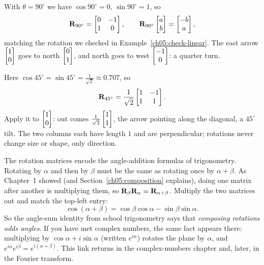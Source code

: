 \begin{example}
\label{ch05:rot90}
With $\theta = 90^\circ$ we have $\cos 90^\circ = 0$, $\sin 90^\circ = 1$, so
\[
  \mathbf{R}_{90^\circ} = \begin{bmatrix} 0 & -1 \\ 1 & 0 \end{bmatrix},
  \qquad
  \mathbf{R}_{90^\circ}\begin{bmatrix}a\\b\end{bmatrix} = \begin{bmatrix}-b\\a\end{bmatrix},
\]
matching the rotation we checked in Example~\ref{ch05:check-linear}. The east
arrow $\begin{bmatrix}1\\0\end{bmatrix}$ goes to north $\begin{bmatrix}0\\1\end{bmatrix}$, and north goes to west
$\begin{bmatrix}-1\\0\end{bmatrix}$: a quarter turn.
\end{example}

\begin{example}
\label{ch05:rot45}
Here $\cos 45^\circ = \sin 45^\circ = \tfrac{1}{\sqrt 2} \approx 0.707$, so
\[
  \mathbf{R}_{45^\circ} = \frac{1}{\sqrt 2}\begin{bmatrix} 1 & -1 \\ 1 & 1\end{bmatrix}.
\]
Apply it to $\begin{bmatrix}1\\0\end{bmatrix}$: out comes $\tfrac{1}{\sqrt2}\begin{bmatrix}1\\1\end{bmatrix}$, the
arrow pointing along the diagonal, a $45^\circ$ tilt. The two columns each have
length $1$ and are perpendicular; rotations never change
size or shape, only direction.
\end{example}

\begin{connectionbox}
The rotation matrices encode the angle-addition formulas of
trigonometry. Rotating by $\alpha$ and then by $\beta$ must be the same as
rotating once by $\alpha + \beta$. As Chapter~1 showed (and
Section~\ref{ch05:composition} explains), doing one matrix after another is
multiplying them, so $\mathbf{R}_\beta \mathbf{R}_\alpha =
\mathbf{R}_{\alpha+\beta}$. Multiply the two matrices out and match the top-left
entry:
\[
  \cos(\alpha+\beta) = \cos\beta\cos\alpha - \sin\beta\sin\alpha.
\]
So the angle-sum identity from school trigonometry says that
\emph{composing rotations adds angles}. If you have met complex numbers, the same
fact appears there: multiplying by $\cos\alpha + i\sin\alpha$ (written
$e^{i\alpha}$) rotates the plane by $\alpha$, and $e^{i\alpha} e^{i\beta} =
e^{i(\alpha+\beta)}$. This link returns in the complex-numbers chapter and, later,
in the Fourier transform.
\end{connectionbox}

